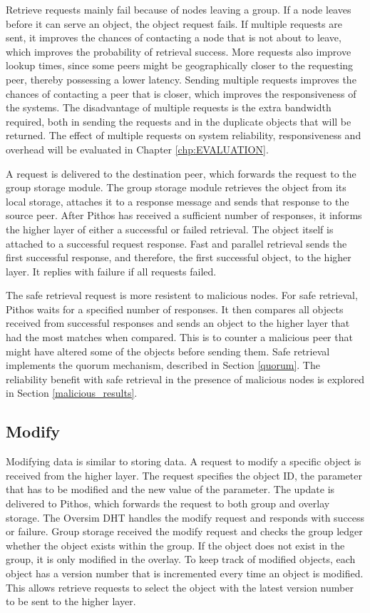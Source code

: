 Retrieve requests mainly fail because of nodes leaving a group. If a node leaves before it can serve an object, the object request fails. If multiple requests are sent, it improves the chances of contacting a node that is not about to leave, which improves the probability of retrieval success. More requests also improve lookup times, since some peers might be geographically closer to the requesting peer, thereby possessing a lower latency. Sending multiple requests improves the chances of contacting a peer that is closer, which improves the responsiveness of the systems. The disadvantage of multiple requests is the extra bandwidth required, both in sending the requests and in the duplicate objects that will be returned. The effect of multiple requests on system reliability, responsiveness and overhead will be evaluated in Chapter \ref{chp:EVALUATION}.

A request is delivered to the destination peer, which forwards the request to the group storage module. The group storage module retrieves the object from its local storage, attaches it to a response message and sends that response to the source peer. After Pithos has received a sufficient number of responses, it informs the higher layer of either a successful or failed retrieval. The object itself is attached to a successful request response. Fast and parallel retrieval sends the first successful response, and therefore, the first successful object, to the higher layer. It replies with failure if all requests failed.

The safe retrieval request is more resistent to malicious nodes. For safe retrieval, Pithos waits for a specified number of responses. It then compares all objects received from successful responses and sends an object to the higher layer that had the most matches when compared. This is to counter a malicious peer that might have altered some of the objects before sending them. Safe retrieval implements the quorum mechanism, described in Section \ref{quorum}.
The reliability benefit with safe retrieval in the presence of malicious nodes is explored in Section \ref{malicious_results}.

\subsection{Modify}

Modifying data is similar to storing data. A request to modify a specific object is received from the higher layer. The request specifies the object ID, the parameter that has to be modified and the new value of the parameter. The update is delivered to Pithos, which forwards the request to both group and overlay storage. The Oversim DHT handles the modify request and responds with success or failure. Group storage received the modify request and checks the group ledger whether the object exists within the group. If the object does not exist in the group, it is only modified in the overlay. To keep track of modified objects, each object has a version number that is incremented every time an object is modified. This allows retrieve requests to select the object with the latest version number to be sent to the higher layer.

